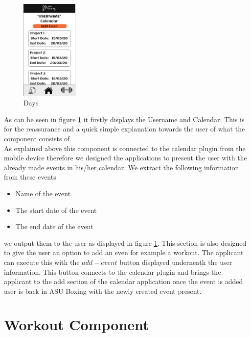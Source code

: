 \documentclass[a4paper,12pt]{report}
\begin{document}
\begin{figure}
\centering
\includegraphics[width=0.25\textwidth]{images/profilePageBorder.png}
\caption{\label{fig:pComponent}Days}
\end{figure}




As can be seen in figure \ref{fig:pComponent} it firstly displays the Username and Calendar. This is for the reassurance and a quick simple explanation towards the user of what the component consists of.\\
As explained above this component is connected to the calendar plugin from the mobile device therefore we designed the applications to present the user with the already made events in his/her calendar.
We extract the following information from these events 
\begin{itemize}
    \item Name of the event
    \item The start date of the event
    \item The end date of the event
\end{itemize}
we output them to the user as displayed in figure \ref{fig:pComponent}.
This section is also designed to give the user an option to add an even for example a workout. The applicant can execute this with the $add-event$ button displayed underneath the user information.
This button connects to the calendar plugin and brings the applicant to the add section of the calendar application once the event is added user is back in  ASU Boxing with the newly created event present.

\section{Workout Component}
\end{document}
